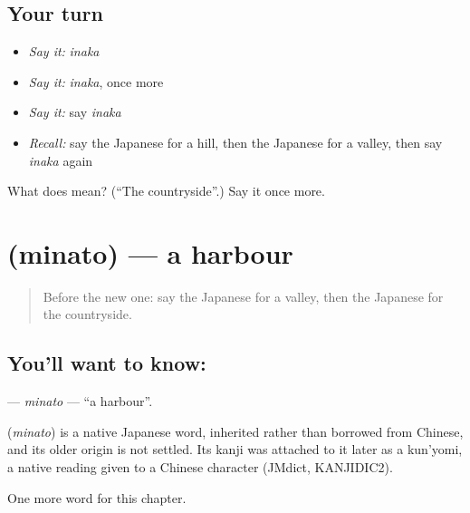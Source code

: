 \subsection*{Your turn}
\begin{itemize}
\raggedright
  \item \emph{Say it:} \emph{inaka}
  \item \emph{Say it:} \emph{inaka}, once more
  \item \emph{Say it:} say \emph{inaka}
  \item \emph{Recall:} say the Japanese for a hill, then the Japanese for a valley, then say \emph{inaka} again
\end{itemize}

\begin{tcolorbox}[breakable,colback=teal!4,colframe=teal!35!black,title={Before you move on}]
What does  mean? (\textquotedblleft{}The countryside\textquotedblright{}.) Say it once more.
\end{tcolorbox}
\section[\texorpdfstring{\ja{みなと} (minato)}{みなと (minato)}]{ (minato) — a harbour}

\label{lesson:JA-C68-minato}



\begin{quote}
Before the new one: say the Japanese for a valley, then the Japanese for the countryside.
\end{quote}

\subsection*{You'll want to know: }
\textbf{} — \emph{minato} — \textquotedblleft{}a harbour\textquotedblright{}.

\begin{cousinweb}
\textbf{} (\emph{minato}) is a native Japanese word, inherited rather than borrowed from Chinese, and its older origin is not settled. Its kanji was attached to it later as a kun'yomi, a native reading given to a Chinese character (JMdict, KANJIDIC2).
\end{cousinweb}

\begin{grammarlens}[title={What you've built}]
One more word for this chapter.
\end{grammarlens}

